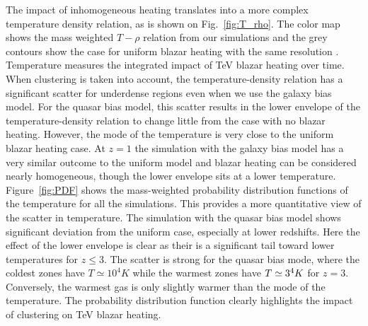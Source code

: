\documentclass[twocolumns]{emulateapj}
\begin{document}
The impact of inhomogeneous heating translates into a more complex temperature density relation, as is shown on Fig.~\ref{fig:T_rho}. The color map shows the mass weighted $T-\rho$ relation from our simulations and the grey contours show the case for uniform blazar heating with the same resolution \citep{2012MNRAS.423..149P}. Temperature measures the integrated impact of TeV blazar heating over time. When clustering is taken into account, the temperature-density relation has a significant scatter for underdense regions even when we use the galaxy bias model. For the quasar bias model, this scatter results in the lower envelope of the temperature-density relation to change little from the case with no blazar heating. However, the mode of the temperature is very close to the uniform blazar heating case. At $z=1$ the simulation with the galaxy bias model has a very similar outcome to the uniform model and blazar heating can be considered nearly homogeneous, though the lower envelope sits at a lower temperature.
Figure~\ref{fig:PDF} shows the mass-weighted probability distribution functions of the temperature for all the simulations. This provides a more quantitative view of the scatter in temperature. The simulation with the quasar bias model shows significant deviation from the uniform case, especially at lower redshifts. Here the effect of the lower envelope is clear as their is a significant tail toward lower temperatures for $z \leqslant 3$. The scatter is strong for the quasar bias mode, where the coldest zones have $T\simeq 10^4K$ while the warmest zones have $T\simeq 3\time 10^4K$ for $z=3$. Conversely, the warmest gas is only slightly warmer than the mode of the temperature. The probability distribution function clearly highlights the impact of clustering on TeV blazar heating.
\end{document}
